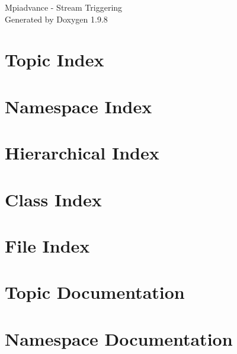 \documentclass[twoside]{book}
\newcommand{\+}{\discretionary{\mbox{\scriptsize$\hookleftarrow$}}{}{}}
\newcommand{\clearemptydoublepage}{%
    \newpage{\pagestyle{empty}\cleardoublepage}%
  }
\begin{document}
  \raggedbottom
    \hypersetup{pageanchor=false,
                bookmarksnumbered=true,
                pdfencoding=unicode
               }
  \begin{titlepage}
  \vspace*{7cm}
  \begin{center}%
  {\Large Mpiadvance -\/ Stream Triggering}\\
  \vspace*{1cm}
  {\large Generated by Doxygen 1.9.8}\\
  \end{center}
  \end{titlepage}
  \clearemptydoublepage
  \tableofcontents
  \clearemptydoublepage
  \hypersetup{pageanchor=true}


\chapter{Topic Index}

\chapter{Namespace Index}

\chapter{Hierarchical Index}

\chapter{Class Index}

\chapter{File Index}

\chapter{Topic Documentation}

\chapter{Namespace Documentation}



\end{document}
